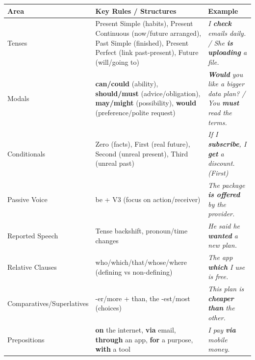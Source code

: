 \documentclass[11pt]{article}
\newcommand{\cle}[1]{{\popxbold\color{popdark}#1}}
\newcounter{popsec}
\newcounter{popsub}
\newcommand{\courssub}[1]{%
  \stepcounter{popsub}%
  \par\vspace{9pt}\noindent{\popxbold\fontsize{11.5}{13}\selectfont\color{popink}{\color{poporange}\thepopsec.\thepopsub}\hspace{6pt}#1}\par\nopagebreak\vspace{4pt}
}
\begin{document}
\begin{bilan}
\begin{center}
\begin{tabularx}{\linewidth}{|l|X|l|}\hline
\rowcolor{popblueL}
\textbf{Area} & \textbf{Key Rules / Structures} & \textbf{Example} \\ \hline
\cle{Tenses} & Present Simple (habits), Present Continuous (now/future arranged), Past Simple (finished), Present Perfect (link past-present), Future (will/going to) & \emph{I \textbf{check} emails daily. / She \textbf{is uploading} a file.} \\ \hline
\cle{Modals} & \textbf{can/could} (ability), \textbf{should/must} (advice/obligation), \textbf{may/might} (possibility), \textbf{would} (preference/polite request) & \emph{\textbf{Would} you like a bigger data plan? / You \textbf{must} read the terms.} \\ \hline
\cle{Conditionals} & Zero (facts), First (real future), Second (unreal present), Third (unreal past) & \emph{If I \textbf{subscribe}, I \textbf{get} a discount. (First)} \\ \hline
\cle{Passive Voice} & be + V3 (focus on action/receiver) & \emph{The package \textbf{is offered} by the provider.} \\ \hline
\cle{Reported Speech} & Tense backshift, pronoun/time changes & \emph{He said he \textbf{wanted} a new plan.} \\ \hline
\cle{Relative Clauses} & who/which/that/whose/where (defining vs non-defining) & \emph{The app \textbf{which} I use is free.} \\ \hline
\cle{Comparatives/Superlatives} & -er/more + than, the -est/most (choices) & \emph{This plan is \textbf{cheaper than} the other.} \\ \hline
\cle{Prepositions} & \textbf{on} the internet, \textbf{via} email, \textbf{through} an app, \textbf{for} a purpose, \textbf{with} a tool & \emph{I pay \textbf{via} mobile money.} \\ \hline
\end{tabularx}
\end{center}

\courssub{Express Methods}


\end{bilan}
\end{document}

